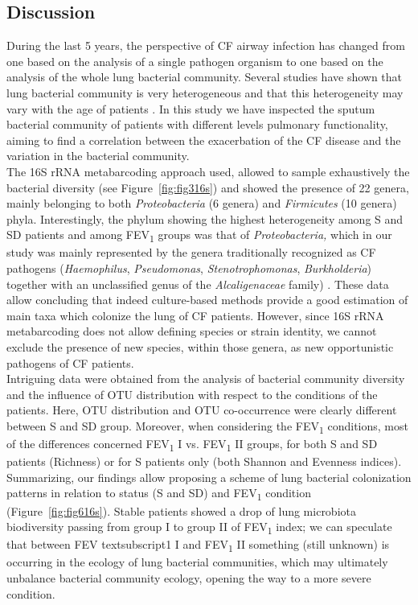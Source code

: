 \subsection{Discussion}
During the last 5 years, the perspective of CF airway infection has changed from one based on the analysis of a single pathogen organism to one based on the analysis of the whole lung bacterial community. Several studies have shown that lung bacterial community is very heterogeneous and that this heterogeneity may vary with the age of patients \cite{cox2010airway, rogers2010determining, willner2009metagenomic, rogers2004characterization}. In this study we have inspected the sputum bacterial community of patients with different levels pulmonary functionality, aiming to find a correlation between the exacerbation of the CF disease and the variation in the bacterial community.\\
The 16S rRNA metabarcoding approach used, allowed to sample exhaustively the bacterial diversity (see Figure~\ref{fig:fig316s}) and showed the presence of 22 genera, mainly belonging to both \textit{Proteobacteria} (6 genera) and \textit{Firmicutes} (10 genera) phyla. Interestingly, the phylum showing the highest heterogeneity among S and SD patients and among FEV\textsubscript{1} groups was that of \textit{Proteobacteria, }which in our study was mainly represented by the genera traditionally recognized as CF pathogens (\textit{Haemophilus}, \textit{Pseudomonas}, \textit{Stenotrophomonas}, \textit{Burkholderia}) together with an unclassified genus of the \textit{Alcaligenaceae }family) \cite{lipuma2010changing}. These data allow concluding that indeed culture-based methods provide a good estimation of main taxa which colonize the lung of CF patients. However, since 16S rRNA metabarcoding does not allow defining species or strain identity, we cannot exclude the presence of new species, within those genera, as new opportunistic pathogens of CF patients.\\
Intriguing data were obtained from the analysis of bacterial community diversity and the influence of OTU distribution with respect to the conditions of the patients. Here, OTU distribution and OTU co-occurrence were clearly different between S and SD group. Moreover, when considering the FEV\textsubscript{1} conditions, most of the differences concerned FEV\textsubscript{1} I vs. FEV\textsubscript{1} II groups, for both S and SD patients (Richness) or for S patients only (both Shannon and Evenness indices).\\
Summarizing, our findings allow proposing a scheme of lung bacterial colonization patterns in relation to status (S and SD) and FEV\textsubscript{1} condition (Figure~\ref{fig:fig616s}). Stable patients showed a drop of lung microbiota biodiversity passing from group I to group II of FEV\textsubscript{1} index; we can speculate that between FEV textsubscript{1} I and FEV\textsubscript{1} II something (still unknown) is occurring in the ecology of lung bacterial communities, which may ultimately unbalance bacterial community ecology, opening the way to a more severe condition.\\%
